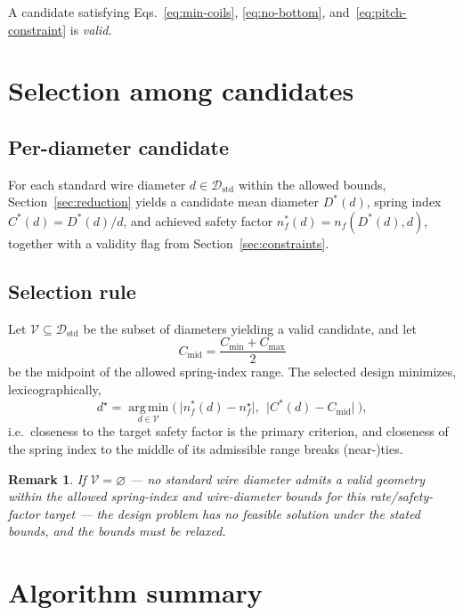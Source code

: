 \documentclass[11pt]{article}
\newtheorem{remark}{Remark}
\begin{document}
A candidate satisfying Eqs.~\eqref{eq:min-coils},
\eqref{eq:no-bottom}, and~\eqref{eq:pitch-constraint} is \emph{valid}.

\section{Selection among candidates}

\subsection{Per-diameter candidate}

For each standard wire diameter $d\in\mathcal{D}_{\mathrm{std}}$ within
the allowed bounds, Section~\ref{sec:reduction} yields a candidate mean
diameter $D^{*}(d)$, spring index $C^{*}(d)=D^{*}(d)/d$, and achieved
safety factor $n_f^{*}(d) = n_f(D^{*}(d),d)$, together with a validity
flag from Section~\ref{sec:constraints}.

\subsection{Selection rule}

Let $\mathcal{V}\subseteq\mathcal{D}_{\mathrm{std}}$ be the subset of
diameters yielding a valid candidate, and let
\begin{equation}
C_{\mathrm{mid}} = \frac{C_{\min}+C_{\max}}{2}
\end{equation}
be the midpoint of the allowed spring-index range. The selected design
minimizes, lexicographically,
\begin{equation}
d^{\star} = \operatorname*{arg\,min}_{d \in \mathcal{V}}
\Big(\ \big|n_f^{*}(d) - n_f^{\star}\big|,\ \ \big|C^{*}(d) - C_{\mathrm{mid}}\big|\ \Big),
\label{eq:selection-rule}
\end{equation}
i.e.\ closeness to the target safety factor is the primary criterion,
and closeness of the spring index to the middle of its admissible range
breaks (near-)ties.

\begin{remark}
If $\mathcal{V}=\varnothing$ — no standard wire diameter admits a valid
geometry within the allowed spring-index and wire-diameter bounds for
this rate/safety-factor target — the design problem has no feasible
solution under the stated bounds, and the bounds must be relaxed.
\end{remark}

\section{Algorithm summary}
\end{document}
